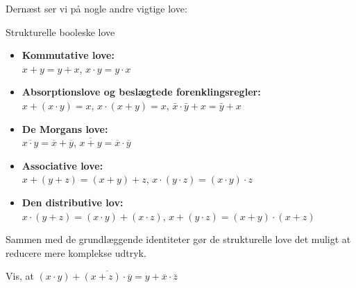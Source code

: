 Dernæst ser vi på nogle andre vigtige love:

\begin{custombox}{Strukturelle booleske love}
\begin{itemize}
    \item \textbf{Kommutative love:} \\
    \hspace*{15pt}$x + y = y + x$, \quad $x \cdot y = y \cdot x$
    
    \item \textbf{Absorptionslove og beslægtede forenklingsregler:} \\
    \hspace*{15pt}$x + (x \cdot y) = x$, \quad $x \cdot (x + y) = x$, \quad $\bar{x} \cdot \bar{y}+x=\bar{y}+x$
    
    \item \textbf{De Morgans love:} \\
    \hspace*{15pt} $\overline{x \cdot y} = \overline{x} + \overline{y}$, \quad $\overline{x + y} = \overline{x} \cdot \overline{y}$
    \item \textbf{Associative love:} \\
    \hspace*{15pt} $x + (y + z) = (x + y) + z$, \quad $x \cdot (y \cdot z) = (x \cdot y) \cdot z$
    
    \item \textbf{Den distributive lov:} \\
    \hspace*{15pt} $x \cdot (y + z) = (x \cdot y) + (x \cdot z)$, \quad $x + (y \cdot z) = (x + y) \cdot (x + z)$
\end{itemize}
\end{custombox}

Sammen med de grundlæggende identiteter gør de strukturelle love det muligt at reducere mere komplekse udtryk.

\begin{example}
    Vis, at
    \(
    (x \cdot y) + \overline{(x + z) \cdot \overline{y}} = y + \overline{x} \cdot \overline{z}
    \)
\end{example}


